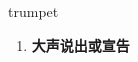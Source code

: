 
\begin{frame}
{\huge trumpet}
\begin{center}
\begin{enumerate}\Large
  \item \textbf{大声说出或宣告}
\end{enumerate}
\end{center}
\end{frame}
